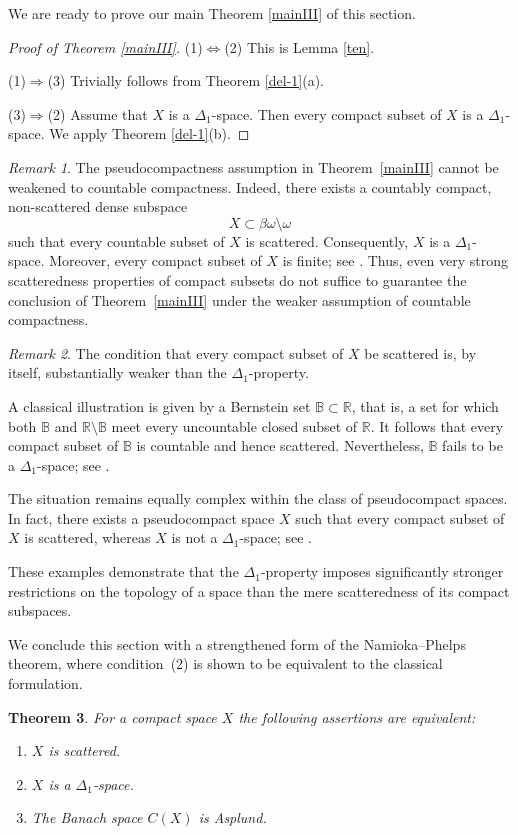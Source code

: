 \documentclass[12pt]{amsart}
\theoremstyle{plain}
\newtheorem{theorem}{Theorem}[section]
\theoremstyle{definition}
\theoremstyle{remark}
\newtheorem{remark}[theorem]{Remark}
\def\B{{\mathbb B}}
\begin{document}
We are ready to prove our main Theorem  \ref{mainIII} of this section.

\begin{proof}[Proof of Theorem \ref{mainIII}]

(1)$\Longleftrightarrow$(2) This is Lemma \ref{ten}.

(1)$\Longrightarrow$(3)  Trivially follows from Theorem \ref{del-1}(a).

(3)$\Longrightarrow$(2) Assume  that $X$ is a $\Delta_1$-space. Then every compact subset of $X$ is a $\Delta_1$-space.
We apply Theorem \ref{del-1}(b).
\end{proof}
\begin{remark}
The pseudocompactness assumption in Theorem~\ref{mainIII} cannot be weakened to countable compactness. Indeed, there exists a countably compact, non-scattered dense subspace
\[
X\subset \beta\omega\setminus\omega
\]
such that every countable subset of $X$ is scattered. Consequently, $X$ is a $\Delta_1$-space. Moreover, every compact subset of $X$ is finite; see \cite[Example~2.18]{KKuL1}. Thus, even very strong scatteredness properties of compact subsets do not suffice to guarantee the conclusion of Theorem~\ref{mainIII} under the weaker assumption of countable compactness.
\end{remark}

\begin{remark}
The condition that every compact subset of $X$ be scattered is, by itself, substantially weaker than the $\Delta_1$-property.

A classical illustration is given by a Bernstein set $\B\subset\mathbb R$, that is, a set for which both $\B$ and $\mathbb R\setminus\B$ meet every uncountable closed subset of $\mathbb R$. It follows that every compact subset of $\B$ is countable and hence scattered. Nevertheless, $\B$ fails to be a $\Delta_1$-space; see \cite[Example~2.20]{KKuL1}.

The situation remains equally complex within the class of pseudocompact spaces. In fact, there exists a pseudocompact space $X$ such that every compact subset of $X$ is scattered, whereas $X$ is not a $\Delta_1$-space; see \cite[Example~3.2]{KKuL1}.

These examples demonstrate that the $\Delta_1$-property imposes significantly stronger restrictions on the topology of a space than the mere scatteredness of its compact subspaces.
\end{remark}
We conclude this section with a strengthened form of the Namioka--Phelps theorem, where condition~(2) is shown to be equivalent to the classical formulation.
\begin{theorem}
For a compact space $X$ the following assertions are equivalent:
\begin{enumerate}
\item $X$ is scattered.
\item $X$ is a $\Delta_1$-space.
\item The Banach space $C(X)$ is Asplund.
\end{enumerate}
\end{theorem}
\end{document}
